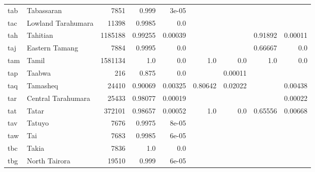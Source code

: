 \documentclass[11pt]{article}
\begin{document}
\begin{table*}[h]
{\begin{tabular}{llrrrrrrr}
tab         & Tabassaran         & 7851         & 0.999         & 3e-05         &          &          &          &          \\

tac         & Lowland Tarahumara         & 11398         & 0.9985         & 0.0         &          &          &          &          \\

tah         & Tahitian         & 1185188         & 0.99255         & 0.00039         &          &          & 0.91892         & 0.00011         \\

taj         & Eastern Tamang         & 7884         & 0.9995         & 0.0         &          &          & 0.66667         & 0.0         \\

tam         & Tamil         & 1581134         & 1.0         & 0.0         & 1.0         & 0.0         & 1.0         & 0.0         \\

tap         & Taabwa         & 216         & 0.875         & 0.0         &          & 0.00011         &          &          \\

taq         & Tamasheq         & 24410         & 0.90069         & 0.00325         & 0.80642         & 0.02022         &          & 0.00438         \\

tar         & Central Tarahumara         & 25433         & 0.98077         & 0.00019         &          &          &          & 0.00022         \\

tat         & Tatar         & 372101         & 0.98657         & 0.00052         & 1.0         & 0.0         & 0.65556         & 0.00668         \\

tav         & Tatuyo         & 7676         & 0.9975         & 8e-05         &          &          &          &          \\

taw         & Tai         & 7683         & 0.9985         & 6e-05         &          &          &          &          \\

tbc         & Takia         & 7836         & 1.0         & 0.0         &          &          &          &          \\

tbg         & North Tairora         & 19510         & 0.999         & 6e-05         &          &          &          &          \\


\end{tabular}}
\end{table*}
\end{document}
